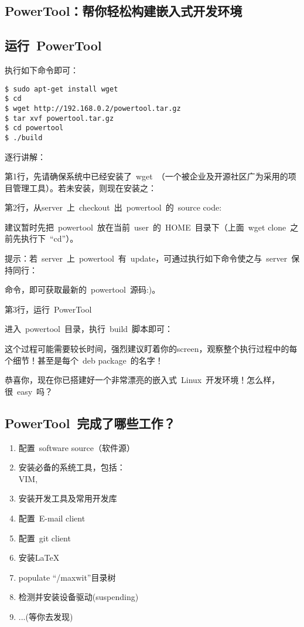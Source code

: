 \documentclass[a4paper,11pt,oneside]{article}
\begin{document}
\begin{CJK*}{UTF8}{gbsn}
\section{PowerTool：帮你轻松构建嵌入式开发环境}

\subsection{运行~PowerTool}

执行如下命令即可：
\begin{lstlisting}
$ sudo apt-get install wget
$ cd
$ wget http://192.168.0.2/powertool.tar.gz
$ tar xvf powertool.tar.gz
$ cd powertool
$ ./build
\end{lstlisting}

逐行讲解：

第1行，先请确保系统中已经安装了~wget~（一个被企业及开源社区广为采用的项目管理工具）。若未安装，则现在安装之：

第2行，从server~上~checkout~出~powertool~的~source code:

建议暂时先把~powertool~放在当前~user~的~HOME~目录下（上面~wget clone~之前先执行下~``cd''）。

提示：若~server~上~powertool~有~update，可通过执行如下命令使之与~server~保持同行：

命令，即可获取最新的~powertool~源码:)。

第3行，运行~PowerTool

进入~powertool~目录，执行~build~脚本即可：

这个过程可能需要较长时间，强烈建议盯着你的screen，观察整个执行过程中的每个细节！甚至是每个~deb package~的名字！

恭喜你，现在你已搭建好一个非常漂亮的嵌入式~Linux~开发环境！怎么样，很~easy~吗？\smiley

\subsection{PowerTool~完成了哪些工作？}
\begin{enumerate}
\item 配置~software source（软件源）
\item 安装必备的系统工具，包括：\\
VIM, 
\item 安装开发工具及常用开发库
\item 配置~E-mail client
\item 配置~git client
\item 安装\LaTeX
\item populate ``/maxwit''目录树
\item 检测并安装设备驱动(suspending)
\item ...(等你去发现)
\end{enumerate}


\end{CJK*}
\end{document}
